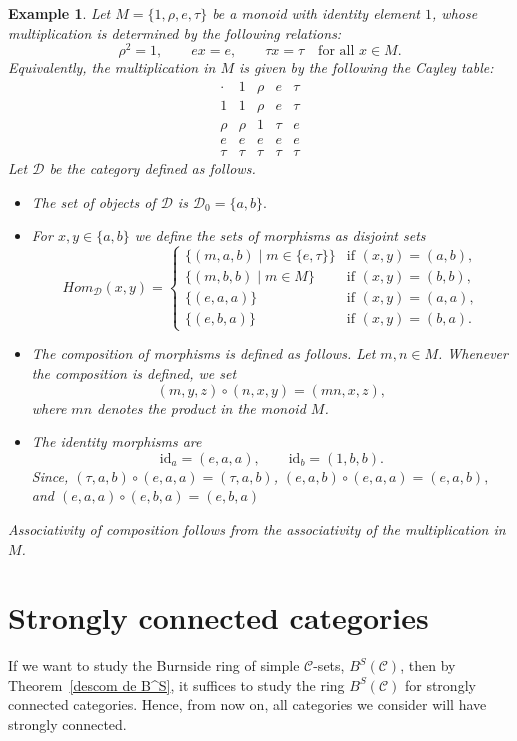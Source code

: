 \documentclass[a4paper]{article}
\newtheorem{exam}[thm]{Example}
\theoremstyle{definition}
\theoremstyle{remark}
\newcommand*{\cat}[1]{\mathcal{#1}}
\begin{document}
\begin{exam}\label{the example}
Let 
$ M=\{1,\rho,e,\tau\} $ 
be a monoid with identity element $1$, whose multiplication is determined by the following relations:
\[
\rho^2=1, \qquad ex=e, \qquad \tau x=\tau \quad \text{for all } x\in M.
\]
Equivalently, the multiplication in $M$ is given by the following the  Cayley table:
\[
\begin{array}{c|cccc}
\cdot & 1 & \rho & e & \tau \\
\hline
1     & 1 & \rho & e & \tau \\
\rho  & \rho & 1 & \tau & e \\
e     & e & e & e & e \\
\tau  & \tau & \tau & \tau & \tau
\end{array}
\]
Let $\cat{D}$ be the category defined as follows.

\begin{itemize}

\item The set of objects of $\cat{D}$ is $ \cat{D}_0=\{a,b\}. $

\item For $x,y\in \{a,b\}$ we define the sets of morphisms as disjoint sets
\[
Hom_{\cat{D}}(x,y)=
\begin{cases}
\{(m,a,b)\mid m\in \{ e,\tau\} \} & \text{if } (x,y)=(a,b),\\[4pt]
\{(m,b,b)\mid m\in M\} & \text{if } (x,y)=(b,b),\\[4pt]
\{(e,a,a)\} & \text{if } (x,y)=(a,a),\\[4pt]
\{(e,b,a)\} & \text{if } (x,y)=(b,a).
\end{cases}
\]

\item The composition of morphisms is defined as follows.  
Let $m,n\in M$. Whenever the composition is defined, we set
\[
(m,y,z)\circ(n,x,y)=(mn,x,z),
\]
where $mn$ denotes the product in the monoid $M$. 

\item The identity morphisms are
\[
\mathrm{id}_a=(e,a,a), \qquad \mathrm{id}_b=(1,b,b).
\]
Since,  $(\tau,a,b)\circ (e,a,a)=(\tau,a,b)$,  $(e,a,b)\circ (e,a,a)=(e,a,b),$ and $(e,a,a)\circ (e,b,a)=(e,b,a)$
\end{itemize}

Associativity of composition follows from the associativity of the multiplication in $M$.
\end{exam}
\section{Strongly connected categories}\label{strongly connected}
If we want to study the Burnside ring of simple $\cat{C}$-sets, $B^S(\cat{C})$,  then by Theorem~\ref{descom de B^S}, it suffices to study the ring $B^S(\cat{C})$ for  strongly connected categories. Hence, from now on, all categories we consider will have strongly connected.
\end{document}
